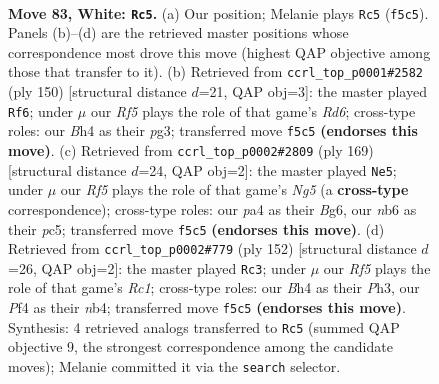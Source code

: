 \documentclass[11pt]{article}
\begin{document}
\clearpage

\begin{figure}[p]\centering
\begin{subfigure}{0.46\textwidth}\centering
\resizebox{\linewidth}{!}{%
\newchessgame
\chessboard[
  setfen={7k/8/1n1r4/5R2/p4P1B/P6P/6K1/8 w - - 21 83},
  showmover=false,
  pgfstyle=straightmove, color=movearrow, markmove={f5-c5}
]}
\caption{}
\end{subfigure}\hfill
\begin{subfigure}{0.46\textwidth}\centering
\resizebox{\linewidth}{!}{%
\newchessgame
\chessboard[
  setfen={8/1k6/3R4/3P3p/4r3/6p1/6P1/5K2 w - - 0 76},
  showmover=false,
  pgfstyle=straightmove, color=movearrow, markmove={d6-f6}
]}
\caption{}
\end{subfigure}
\\[4pt]
\begin{subfigure}{0.46\textwidth}\centering
\resizebox{\linewidth}{!}{%
\newchessgame
\chessboard[
  setfen={2R5/4k3/4p1b1/2P3p1/B5n1/2K5/8/8 b - - 6 85},
  showmover=false,
  pgfstyle=straightmove, color=movearrow, markmove={g4-e5}
]}
\caption{}
\end{subfigure}\hfill
\begin{subfigure}{0.46\textwidth}\centering
\resizebox{\linewidth}{!}{%
\newchessgame
\chessboard[
  setfen={8/3r3p/6p1/6B1/1n6/7P/4k1P1/2R3K1 w - - 26 77},
  showmover=false,
  pgfstyle=straightmove, color=movearrow, markmove={c1-c3}
]}
\caption{}
\end{subfigure}
\caption{\textbf{Move 83, White: \texttt{Rc5}.} (a) Our position; Melanie plays \texttt{Rc5} (\texttt{f5c5}). Panels (b)--(d) are the retrieved master positions whose correspondence most drove this move (highest QAP objective among those that transfer to it). (b) Retrieved from \texttt{ccrl\_top\_p0001\#2582} (ply 150) [structural distance $d$=21, QAP obj=3]: the master played \texttt{Rf6}; under $\mu$ our \emph{Rf5} plays the role of that game's \emph{Rd6}; cross-type roles: our \emph{B}h4 as their \emph{p}g3; transferred move \texttt{f5c5} \textbf{(endorses this move)}. (c) Retrieved from \texttt{ccrl\_top\_p0002\#2809} (ply 169) [structural distance $d$=24, QAP obj=2]: the master played \texttt{Ne5}; under $\mu$ our \emph{Rf5} plays the role of that game's \emph{Ng5} (a \textbf{cross-type} correspondence); cross-type roles: our \emph{p}a4 as their \emph{B}g6, our \emph{n}b6 as their \emph{p}c5; transferred move \texttt{f5c5} \textbf{(endorses this move)}. (d) Retrieved from \texttt{ccrl\_top\_p0002\#779} (ply 152) [structural distance $d$=26, QAP obj=2]: the master played \texttt{Rc3}; under $\mu$ our \emph{Rf5} plays the role of that game's \emph{Rc1}; cross-type roles: our \emph{B}h4 as their \emph{P}h3, our \emph{P}f4 as their \emph{n}b4; transferred move \texttt{f5c5} \textbf{(endorses this move)}. Synthesis: 4 retrieved analogs transferred to \texttt{Rc5} (summed QAP objective 9, the strongest correspondence among the candidate moves); Melanie committed it via the \texttt{search} selector.}
\label{fig:thought-m164}
\end{figure}
\end{document}
